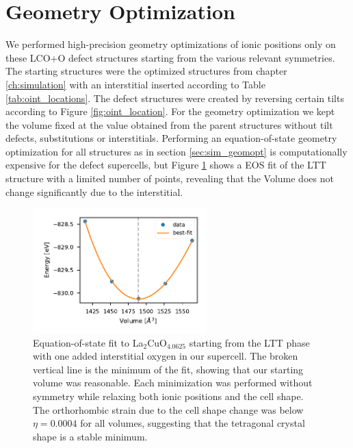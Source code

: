 \section{Geometry Optimization}
We performed high-precision geometry optimizations of ionic positions only on these LCO+O defect structures starting from the various relevant symmetries. The starting structures were the optimized structures from chapter \ref{ch:simulation} with an interstitial inserted according to Table \ref{tab:oint_locations}. The defect structures were created by reversing certain tilts according to Figure \ref{fig:oint_location}. For the geometry optimization we kept the volume fixed at the value obtained from the parent structures without tilt defects, substitutions or interstitials. Performing an equation-of-state geometry optimization for all structures as in section \ref{sec:sim_geomopt} is computationally expensive for the defect supercells, but Figure \ref{fig:lcoo_eos} shows a EOS fit of the LTT structure with a limited number of points, revealing that the Volume does not change significantly due to the interstitial.

\begin{figure}
	\centering
	\includegraphics[width=0.6\textwidth]{fig/md/lcoo_eos.pdf}
	\caption[LCOO EOS]{Equation-of-state fit to La$_2$CuO$_{4.0625}$ starting from the LTT phase with one added interstitial oxygen in our supercell. The broken vertical line is the minimum of the fit, showing that our starting volume was reasonable. Each minimization was performed without symmetry while relaxing both ionic positions and the cell shape. The orthorhombic strain due to the cell shape change was below $\eta = 0.0004$ for all volumes, suggesting that the tetragonal crystal shape is a stable minimum.}
	\label{fig:lcoo_eos}
\end{figure}


